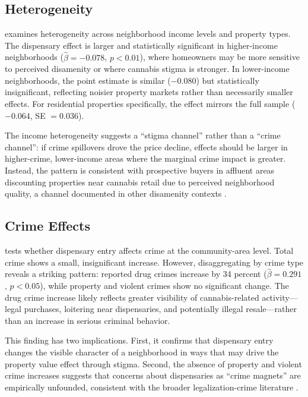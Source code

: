 \documentclass[12pt]{article}
\begin{document}
\subsection{Heterogeneity}

 examines heterogeneity across neighborhood income levels and property types. The dispensary effect is larger and statistically significant in higher-income neighborhoods ($\hat{\beta} = -0.078$, $p < 0.01$), where homeowners may be more sensitive to perceived disamenity or where cannabis stigma is stronger. In lower-income neighborhoods, the point estimate is similar ($-0.080$) but statistically insignificant, reflecting noisier property markets rather than necessarily smaller effects. For residential properties specifically, the effect mirrors the full sample ($-0.064$, SE $= 0.036$).



The income heterogeneity suggests a ``stigma channel'' rather than a ``crime channel'': if crime spillovers drove the price decline, effects should be larger in higher-crime, lower-income areas where the marginal crime impact is greater. Instead, the pattern is consistent with prospective buyers in affluent areas discounting properties near cannabis retail due to perceived neighborhood quality, a channel documented in other disamenity contexts \citep{coulson2013}.

\subsection{Crime Effects}

 tests whether dispensary entry affects crime at the community-area level. Total crime shows a small, insignificant increase. However, disaggregating by crime type reveals a striking pattern: reported drug crimes increase by 34 percent ($\hat{\beta} = 0.291$, $p < 0.05$), while property and violent crimes show no significant change. The drug crime increase likely reflects greater visibility of cannabis-related activity---legal purchases, loitering near dispensaries, and potentially illegal resale---rather than an increase in serious criminal behavior.



This finding has two implications. First, it confirms that dispensary entry changes the visible character of a neighborhood in ways that may drive the property value effect through stigma. Second, the absence of property and violent crime increases suggests that concerns about dispensaries as ``crime magnets'' are empirically unfounded, consistent with the broader legalization-crime literature \citep{gavrilova2019, dragone2019}.
\end{document}
